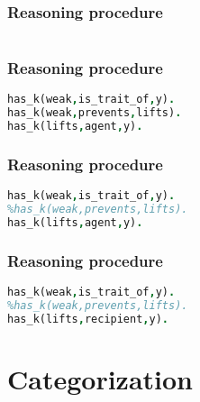 \documentclass[c,8pt,xcolor...,x11names]{beamer}
\begin{document}
\begin{frame}[fragile]
\frametitle{Reasoning procedure}
\begin{columns}
	\begin{column}{0.70\textwidth}
	
	\end{column}	
\end{columns}
\end{frame}

\begin{frame}[fragile]
\frametitle{Reasoning procedure}

\centering


\begin{lstlisting}[language = Prolog, style=SC]
has_k(weak,is_trait_of,y). 		
has_k(weak,prevents,lifts).	 	
has_k(lifts,agent,y).		
\end{lstlisting}
\hspace{2.2cm}
\end{frame}

\begin{frame}[fragile]
\frametitle{Reasoning procedure}

\centering


\begin{lstlisting}[language = Prolog, style=SC]
has_k(weak,is_trait_of,y). 		
%has_k(weak,prevents,lifts).	 	
has_k(lifts,agent,y).		
\end{lstlisting}
\hspace{2.2cm}
\end{frame}

\begin{frame}[fragile]
\frametitle{Reasoning procedure}

\centering


\begin{lstlisting}[language = Prolog, style=SC]
has_k(weak,is_trait_of,y). 		
%has_k(weak,prevents,lifts).	 	
has_k(lifts,recipient,y).		
\end{lstlisting}
\hspace{2.2cm}
\end{frame}


\section{Categorization} 
\end{document}
